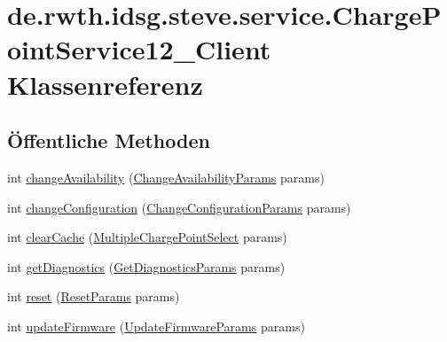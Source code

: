 \hypertarget{classde_1_1rwth_1_1idsg_1_1steve_1_1service_1_1_charge_point_service12___client}{\section{de.\-rwth.\-idsg.\-steve.\-service.\-Charge\-Point\-Service12\-\_\-\-Client Klassenreferenz}
\label{classde_1_1rwth_1_1idsg_1_1steve_1_1service_1_1_charge_point_service12___client}
}
\subsection*{Öffentliche Methoden}
\begin{DoxyCompactItemize}
\item 
int \hyperlink{classde_1_1rwth_1_1idsg_1_1steve_1_1service_1_1_charge_point_service12___client_a1a362db6fbdf8a34f7e057c42b4b1e58}{change\-Availability} (\hyperlink{classde_1_1rwth_1_1idsg_1_1steve_1_1web_1_1dto_1_1ocpp12_1_1_change_availability_params}{Change\-Availability\-Params} params)
\item 
int \hyperlink{classde_1_1rwth_1_1idsg_1_1steve_1_1service_1_1_charge_point_service12___client_a2916119c0f47f5c20943d27ff26d1d57}{change\-Configuration} (\hyperlink{classde_1_1rwth_1_1idsg_1_1steve_1_1web_1_1dto_1_1ocpp12_1_1_change_configuration_params}{Change\-Configuration\-Params} params)
\item 
int \hyperlink{classde_1_1rwth_1_1idsg_1_1steve_1_1service_1_1_charge_point_service12___client_a7a72a83bdc6f50bddfbb4183ccb83e54}{clear\-Cache} (\hyperlink{classde_1_1rwth_1_1idsg_1_1steve_1_1web_1_1dto_1_1common_1_1_multiple_charge_point_select}{Multiple\-Charge\-Point\-Select} params)
\item 
int \hyperlink{classde_1_1rwth_1_1idsg_1_1steve_1_1service_1_1_charge_point_service12___client_a61eea2363ea48a32381f15491a453b01}{get\-Diagnostics} (\hyperlink{classde_1_1rwth_1_1idsg_1_1steve_1_1web_1_1dto_1_1common_1_1_get_diagnostics_params}{Get\-Diagnostics\-Params} params)
\item 
int \hyperlink{classde_1_1rwth_1_1idsg_1_1steve_1_1service_1_1_charge_point_service12___client_a5a8d703d7ffea0cf86de21acc618708d}{reset} (\hyperlink{classde_1_1rwth_1_1idsg_1_1steve_1_1web_1_1dto_1_1ocpp12_1_1_reset_params}{Reset\-Params} params)
\item 
int \hyperlink{classde_1_1rwth_1_1idsg_1_1steve_1_1service_1_1_charge_point_service12___client_aa29c473ae9afdb6dff11b2c79577e3cc}{update\-Firmware} (\hyperlink{classde_1_1rwth_1_1idsg_1_1steve_1_1web_1_1dto_1_1common_1_1_update_firmware_params}{Update\-Firmware\-Params} params)

\end{DoxyCompactItemize}

